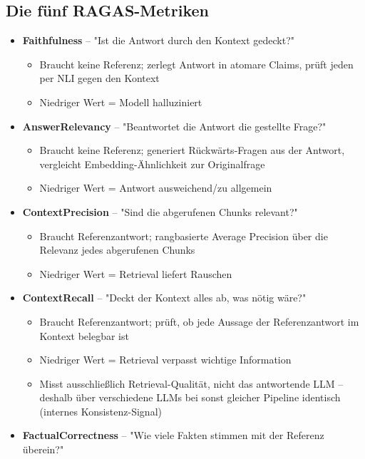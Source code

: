 \documentclass[11pt,a4paper]{article}
\begin{document}
\subsection{Die fünf RAGAS-Metriken}
\begin{itemize}
    \item \textbf{Faithfulness} -- "Ist die Antwort durch den Kontext gedeckt?"
    \begin{itemize}
        \item Braucht keine Referenz; zerlegt Antwort in atomare Claims, prüft jeden per NLI gegen den Kontext
        \item Niedriger Wert = Modell halluziniert
    \end{itemize}
    \item \textbf{AnswerRelevancy} -- "Beantwortet die Antwort die gestellte Frage?"
    \begin{itemize}
        \item Braucht keine Referenz; generiert Rückwärts-Fragen aus der Antwort, vergleicht Embedding-Ähnlichkeit zur Originalfrage
        \item Niedriger Wert = Antwort ausweichend/zu allgemein
    \end{itemize}
    \item \textbf{ContextPrecision} -- "Sind die abgerufenen Chunks relevant?"
    \begin{itemize}
        \item Braucht Referenzantwort; rangbasierte Average Precision über die Relevanz jedes abgerufenen Chunks
        \item Niedriger Wert = Retrieval liefert Rauschen
    \end{itemize}
    \item \textbf{ContextRecall} -- "Deckt der Kontext alles ab, was nötig wäre?"
    \begin{itemize}
        \item Braucht Referenzantwort; prüft, ob jede Aussage der Referenzantwort im Kontext belegbar ist
        \item Niedriger Wert = Retrieval verpasst wichtige Information
        \item Misst ausschließlich Retrieval-Qualität, nicht das antwortende LLM -- deshalb über verschiedene LLMs bei sonst gleicher Pipeline identisch (internes Konsistenz-Signal)
    \end{itemize}
    \item \textbf{FactualCorrectness} -- "Wie viele Fakten stimmen mit der Referenz überein?"
    \begin{itemize}

\end{itemize}
\end{itemize}
\end{document}

